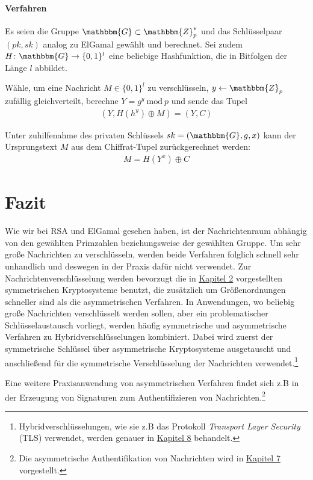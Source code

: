 \paragraph*{Verfahren}
Es seien die Gruppe $\mathbbm{G} \subset \mathbbm{Z}^*_p$ und das Schlüsselpaar $(pk,sk)$ analog zu ElGamal gewählt und berechnet. Sei zudem $H \colon \mathbbm{G} \rightarrow \{0,1\}^l$ eine beliebige Hashfunktion, die in Bitfolgen der Länge $l$ abbildet.

Wähle, um eine Nachricht $M \in \{0,1\}^l$ zu verschlüsseln, $y \leftarrow \mathbbm{Z}_p$ zufällig gleichverteilt, berechne $Y = g^y\ \text{mod}\ p$ und sende das Tupel
\begin{align*}
(Y, H(h^y) \oplus M) = (Y, C)
\end{align*}

Unter zuhilfenahme des privaten Schlüssels $sk = (\mathbbm{G}, g, x)$ kann der Ursprungstext $M$ aus dem Chiffrat-Tupel zurückgerechnet werden:
\begin{align*}
M = H(Y^x) \oplus C
\end{align*}

\section{Fazit}
Wie wir bei RSA und ElGamal gesehen haben, ist der Nachrichtenraum abhängig von den gewählten Primzahlen beziehungsweise der gewählten Gruppe. Um sehr große Nachrichten zu verschlüsseln, werden beide Verfahren folglich schnell sehr unhandlich und deswegen in der Praxis dafür nicht verwendet. Zur Nachrichtenverschlüsselung werden bevorzugt die in \hyperref[cha:symencryption]{Kapitel 2} vorgestellten symmetrischen Kryptosysteme benutzt, die zusätzlich um Größenordnungen schneller sind als die asymmetrischen Verfahren. In Anwendungen, wo beliebig große Nachrichten verschlüsselt werden sollen, aber ein problematischer Schlüsselaustausch vorliegt, werden häufig symmetrische und asymmetrische Verfahren zu Hybridverschlüsselungen kombiniert. Dabei wird zuerst der symmetrische Schlüssel über asymmetrische Kryptosysteme ausgetauscht und anschließend für die symmetrische Verschlüsselung der Nachrichten verwendet.\footnote{Hybridverschlüsselungen, wie sie z.B das Protokoll \textit{Transport Layer Security} (TLS) verwendet, werden genauer in \hyperref[cha:keyexchange]{Kapitel 8} behandelt.}

Eine weitere Praxisanwendung von asymmetrischen Verfahren findet sich z.B in der Erzeugung von Signaturen zum Authentifizieren von Nachrichten.\footnote{Die asymmetrische Authentifikation von Nachrichten wird in \hyperref[cha:asymmauth]{Kapitel 7} vorgestellt.}